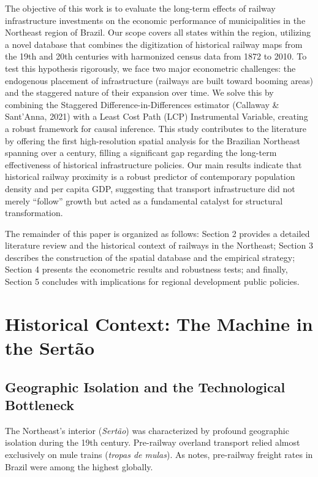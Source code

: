 \documentclass[11pt, a4paper]{article}
\begin{document}
The objective of this work is to evaluate the long-term effects of railway infrastructure investments on the economic performance of municipalities in the Northeast region of Brazil. Our scope covers all states within the region, utilizing a novel database that combines the digitization of historical railway maps from the 19th and 20th centuries with harmonized census data from 1872 to 2010. To test this hypothesis rigorously, we face two major econometric challenges: the endogenous placement of infrastructure (railways are built toward booming areas) and the staggered nature of their expansion over time. We solve this by combining the Staggered Difference-in-Differences estimator (Callaway \& Sant'Anna, 2021) with a Least Cost Path (LCP) Instrumental Variable, creating a robust framework for causal inference. This study contributes to the literature by offering the first high-resolution spatial analysis for the Brazilian Northeast spanning over a century, filling a significant gap regarding the long-term effectiveness of historical infrastructure policies. Our main results indicate that historical railway proximity is a robust predictor of contemporary population density and per capita GDP, suggesting that transport infrastructure did not merely ``follow'' growth but acted as a fundamental catalyst for structural transformation.

The remainder of this paper is organized as follows: Section 2 provides a detailed literature review and the historical context of railways in the Northeast; Section 3 describes the construction of the spatial database and the empirical strategy; Section 4 presents the econometric results and robustness tests; and finally, Section 5 concludes with implications for regional development public policies.

\section{Historical Context: The Machine in the Sertão}

\subsection{Geographic Isolation and the Technological Bottleneck}
The Northeast's interior (\textit{Sertão}) was characterized by profound geographic isolation during the 19th century. Pre-railway overland transport relied almost exclusively on mule trains (\textit{tropas de mulas}). As \cite{summerhill2003} notes, pre-railway freight rates in Brazil were among the highest globally. 
\end{document}
